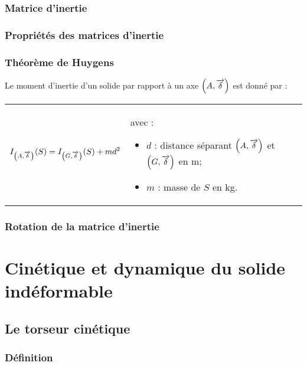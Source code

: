 \documentclass[10pt,fleqn]{article} %
\begin{document}
\subsubsection{Matrice d'inertie}

\subsubsection{Propriétés des matrices d'inertie}
\subsubsection{Théorème de Huygens}
\begin{theorem}
Le moment d'inertie d'un solide par rapport à un axe  $\left(A,\overrightarrow{\delta}\right)$ est donné par :

\begin{tabular}{m{.45\linewidth}m{.45\linewidth}}
$$I_{\left(A,\overrightarrow{\delta}\right)}(S)=I_{\left(G,\overrightarrow{\delta}\right)}(S)+md^2 $$ & 
avec :
\begin{itemize}
\item $d$ : distance séparant $\left(A,\overrightarrow{\delta}\right)$ et $\left(G,\overrightarrow{\delta}\right)$ en m;
\item $m$ : masse de $S$ en kg.
\end{itemize}
\end{tabular}
\end{theorem}
\subsubsection{Rotation de la matrice d'inertie}

\section{Cinétique et dynamique du solide indéformable}
\subsection{Le torseur cinétique}
\subsubsection{Définition}
\end{document}
